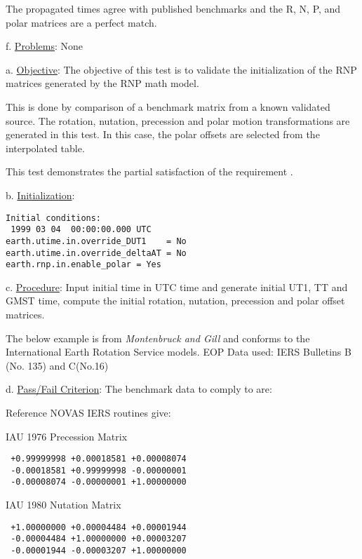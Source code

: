 The propagated times agree with published benchmarks and the R, N, P, and
polar matrices are a perfect match.\newline

f. \underline{Problems}:\newline
None


\label{test:rnp_test3}

a. \underline{Objective}:\newline
The objective of this test is to validate the initialization of the
RNP matrices generated by the RNP math model.

This is done by comparison of a benchmark matrix from a known validated
source.  The rotation, nutation, precession and polar motion transformations
are generated in this test. In this case, the polar offsets are selected
from the interpolated table.

This test demonstrates the partial satisfaction
of the requirement .

b. \underline{Initialization}:
\begin{verbatim}
Initial conditions:
 1999 03 04  00:00:00.000 UTC
earth.utime.in.override_DUT1    = No
earth.utime.in.override_deltaAT = No
earth.rnp.in.enable_polar = Yes
\end{verbatim}

c. \underline{Procedure}:\newline
Input initial time in UTC time and generate initial UT1, TT and GMST time,
compute the initial rotation, nutation, precession
and polar offset matrices.

The below example is from {\em Montenbruck and Gill} \cite{MG}
and conforms to the International Earth Rotation Service models.
EOP Data used: IERS Bulletins B (No. 135) and C(No.16)\newline

d. \underline{Pass/Fail Criterion}:\newline
The benchmark data to comply to are:

Reference NOVAS \cite{NOVAS} IERS routines give:

IAU 1976 Precession Matrix
\begin{verbatim}
 +0.99999998 +0.00018581 +0.00008074
 -0.00018581 +0.99999998 -0.00000001
 -0.00008074 -0.00000001 +1.00000000
\end{verbatim}

IAU 1980 Nutation Matrix
\begin{verbatim}
 +1.00000000 +0.00004484 +0.00001944
 -0.00004484 +1.00000000 +0.00003207
 -0.00001944 -0.00003207 +1.00000000
\end{verbatim}

